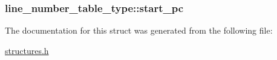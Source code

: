 \subsubsection[{\texorpdfstring{start\+\_\+pc}{start_pc}}]{ line\+\_\+number\+\_\+table\+\_\+type\+::start\+\_\+pc}\hypertarget{structline__number__table__type_ac0e263d3f0484fb8bea365e8b87398e1}{}\label{structline__number__table__type_ac0e263d3f0484fb8bea365e8b87398e1}


The documentation for this struct was generated from the following file\+:\begin{DoxyCompactItemize}
\item 
\hyperlink{structures_8h}{structures.\+h}\end{DoxyCompactItemize}
